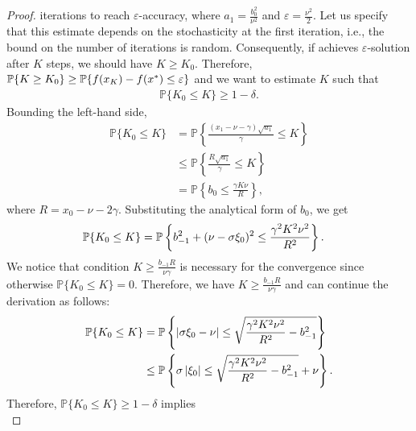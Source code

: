 \documentclass{article}
\begin{document}
\begin{proof}
    iterations to reach $\varepsilon$-accuracy, where $a_1 = \frac{b_0^2}{\nu^2}$ and $\varepsilon = \frac{\nu^2}{2}$. Let us specify that this estimate depends on the stochasticity at the first iteration, i.e., the bound on the number of iterations is random. Consequently, if  achieves $\varepsilon$-solution after $K$ steps, we should have $K \geq K_0$. Therefore, ${\mathbb P}\{K \geq K_0\} \geq {\mathbb P}\{f(x_K) - f(x^*) \leq \varepsilon\}$ and we want to estimate $K$ such that
    \begin{align*}
        \mathbb{P}\{K_0 \leq K\} \geq 1 - \delta.
    \end{align*}
    Bounding the left-hand side,
    \begin{align*}
        \mathbb{P}\{K_0 \leq K\} &= \mathbb{P}\left\{\frac{(x_1 - \nu - \gamma)\sqrt{a_1}}{\gamma}\leq K\right\} \\
        &\leq \mathbb{P}\left\{\frac{R\sqrt{a_1}}{\gamma}\leq K\right\} \\&=
        \mathbb{P}\left\{b_0 \leq \frac{\gamma K \nu}{R}\right\},
    \end{align*}
    where $R = x_0 - \nu - 2\gamma$. Substituting the analytical form of $b_0$, we get 
    \begin{align}
        \mathbb{P}\{K_0 \leq K\} &= \mathbb{P}\left\{b_{-1}^2 + (\nu -\sigma \xi_0)^2 \leq \frac{\gamma^2 K^2 \nu^2}{R^2}\right\}. \notag
    \end{align}
    We notice that condition $K \geq \frac{b_{-1}R}{\nu\gamma}$ is necessary for the convergence since otherwise $\mathbb{P}\{K_0 \leq K\} = 0$. Therefore, we have $K \geq \frac{b_{-1}R}{\nu\gamma}$ and can continue the derivation as follows:
    \begin{align}
        \mathbb{P}\{K_0 \leq K\}
        &= \mathbb{P}\left\{\left\lvert\sigma\xi_0 - \nu\right\rvert \leq \sqrt{\frac{\gamma^2 K^2 \nu^2}{R^2} - b_{-1}^2}\right\} \nonumber \\
        &\leq \mathbb{P}\left\{\sigma\left\lvert\xi_0\right\rvert \leq \sqrt{\frac{\gamma^2 K^2 \nu^2}{R^2} - b_{-1}^2} + \nu\right\}.\notag
    \end{align}
    Therefore, $\mathbb{P}\{K_0 \leq K\} \geq 1-\delta$ implies 
    \begin{equation*}

\end{equation*}
\end{proof}
\end{document}
